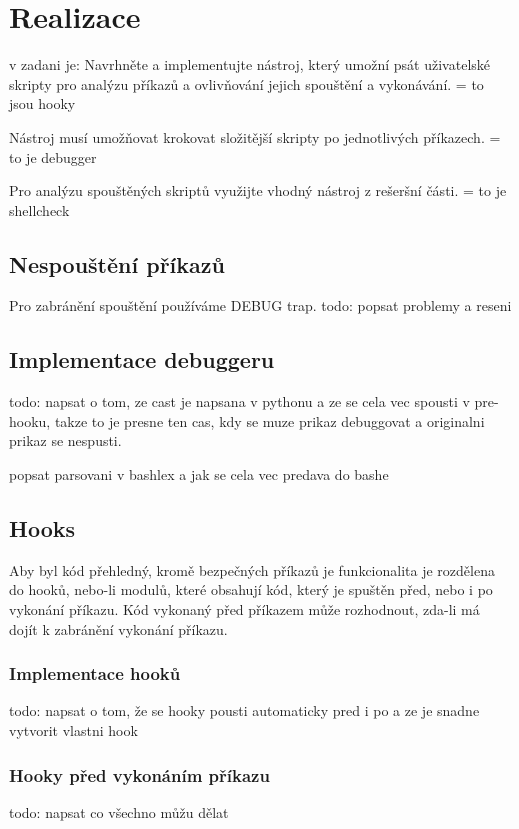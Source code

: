 \documentclass[thesis=M,czech]{FITthesis}[2012/06/26]
\begin{document}
\chapter{Realizace}

v zadani je:
Navrhněte a implementujte nástroj, který umožní psát uživatelské skripty pro analýzu příkazů a ovlivňování jejich spouštění a vykonávání. = to jsou hooky

Nástroj musí umožňovat krokovat složitější skripty po jednotlivých příkazech. = to je debugger

Pro analýzu spouštěných skriptů využijte vhodný nástroj z rešeršní části. = to je shellcheck




%
%
%
%
%
\section{Nespouštění příkazů}
Pro zabránění spouštění používáme DEBUG trap.
todo: popsat problemy a reseni


%
%
%
%
%
\section{Implementace debuggeru}
todo: napsat o tom, ze cast je napsana v pythonu a ze se cela vec spousti v pre-hooku, takze to je presne ten cas, kdy se muze prikaz debuggovat a originalni prikaz se nespusti.

popsat parsovani v bashlex a jak se cela vec predava do bashe

%
%
%
%
%
\section{Hooks}
Aby byl kód přehledný, kromě bezpečných příkazů je funkcionalita je rozdělena do hooků, nebo-li modulů, které obsahují kód, který je spuštěn před, nebo i po vykonání příkazu. Kód vykonaný před příkazem může rozhodnout, zda-li má dojít k zabránění vykonání příkazu.


\subsection{Implementace hooků}
todo: napsat o tom, že se hooky pousti automaticky pred i po a ze je snadne vytvorit vlastni hook

\subsection{Hooky před vykonáním příkazu}
todo: napsat co všechno můžu dělat
\end{document}
